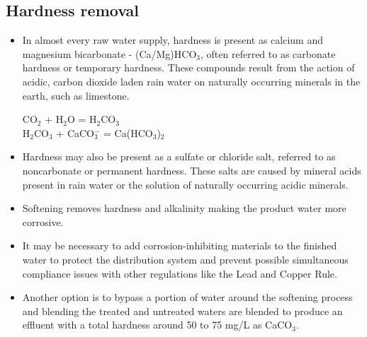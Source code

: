 \subsection{Hardness removal}
\begin{itemize}
\item In almost every raw water supply, hardness is present as calcium and magnesium bicarbonate - (Ca/Mg)HCO$_3$, often referred to as carbonate hardness or temporary hardness. These compounds result from the action of acidic, carbon dioxide laden rain water on naturally occurring minerals in the earth, such as limestone.

CO$_2$ + H$_2$O = H$_2$CO$_3$\\

H$_2$CO$_3$ + CaCO$_3^-$ = Ca(HCO$_3$)$_2$

\item Hardness may also be present as a sulfate or chloride salt, referred to as noncarbonate or permanent hardness. These salts are caused by mineral acids present in rain water or the solution of naturally occurring acidic minerals.

\item Softening removes hardness and alkalinity making the product water more corrosive.  
\item It may be necessary to add corrosion-inhibiting materials to the finished water to protect the distribution system and prevent possible simultaneous compliance issues with other regulations like the Lead and Copper Rule.
\item Another option is to bypass a portion of water around the softening process and blending the treated and untreated waters are blended to produce an effluent with a total hardness around 50 to 75 mg/L as CaCO$_3$. 


\end{itemize}
